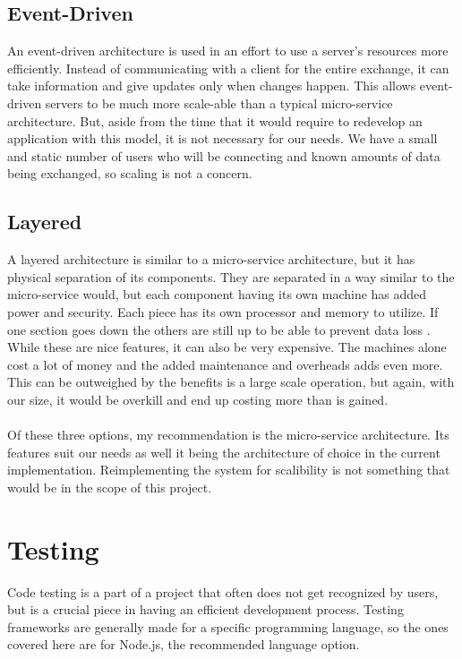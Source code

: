     \subsection{Event-Driven}
        An event-driven architecture is used in an effort to use a server's resources more efficiently. Instead of communicating with a client for the entire exchange, it can take information and give updates only when changes happen. This allows event-driven servers to be much more scale-able than a typical micro-service architecture. But, aside from the time that it would require to redevelop an application with this model, it is not necessary for our needs. We have a small and static number of users who will be connecting and known amounts of data being exchanged, so scaling is not a concern.

    \subsection{Layered}
        A layered architecture is similar to a micro-service architecture, but it has physical separation of its components. They are separated in a way similar to the micro-service would, but each component having its own machine has added power and security. Each piece has its own processor and memory to utilize. If one section goes down the others are still up to be able to prevent data loss \cite{multilayer}. While these are nice features, it can also be very expensive. The machines alone cost a lot of money and the added maintenance and overheads adds even more. This can be outweighed by the benefits is a large scale operation, but again, with our size, it would be overkill and end up costing more than is gained.
\\\\
    \indent Of these three options, my recommendation is the micro-service architecture. Its features suit our needs as well it being the architecture of choice in the current implementation. Reimplementing the system for scalibility is not something that would be in the scope of this project.

\break
\section{Testing}
    Code testing is a part of a project that often does not get recognized by users, but is a crucial piece in having an efficient development process. Testing frameworks are generally made for a specific programming language, so the ones covered here are for Node.js, the recommended language option.
